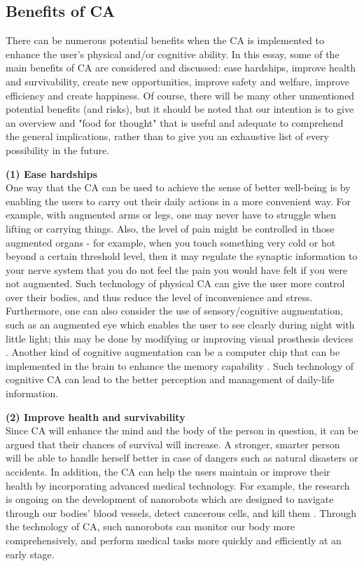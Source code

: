 \subsection{Benefits of CA}

There can be numerous potential benefits when the CA is implemented to enhance the user's physical and/or cognitive ability. In this essay, some of the main benefits of CA are considered and discussed: ease hardships, improve health and survivability, create new opportunities, improve safety and welfare, improve efficiency and create happiness. Of course, there will be many other unmentioned potential benefits (and risks), but it should be noted that our intention is to give an overview and "food for thought" that is useful and adequate to comprehend the general implications, rather than to give you an exhaustive list of every possibility in the future. 

{\bf (1) Ease hardships} \\ 
One way that the CA can be used to achieve the sense of better well-being is by enabling the users to carry out their daily actions in a more convenient way. For example, with augmented arms or legs, one may never have to struggle when lifting or carrying things. Also, the level of pain might be controlled in those augmented organs - for example, when you touch something very cold or hot beyond a certain threshold level, then it may regulate the synaptic information to your nerve system that you do not feel the pain you would have felt if you were not augmented. Such technology of physical CA can give the user more control over their bodies, and thus reduce the level of inconvenience and stress. Furthermore, one can also consider the use of sensory/cognitive augmentation, such as an augmented eye which enables the user to see clearly during night with little light; this may be done by modifying or improving visual prosthesis devices \cite{shepherd2013visual}. Another kind of cognitive augmentation can be a computer chip that can be implemented in the brain to enhance the memory capability \cite{berger2011cortical}. Such technology of cognitive CA can lead to the better perception and management of daily-life information.

{\bf (2) Improve health and survivability} \\
Since CA will enhance the mind and the body of the person in question, it can be argued that their chances of survival will increase. A stronger, smarter person will be able to handle herself better in case of dangers such as natural disasters or accidents. In addition, the CA can help the users maintain or improve their health by incorporating advanced medical technology. For example, the research is ongoing on the development of nanorobots which are designed to navigate through our bodies' blood vessels, detect cancerous cells, and kill them \cite{nanorobot}. Through the technology of CA, such nanorobots can monitor our body more comprehensively, and perform medical tasks more quickly and efficiently at an early stage. 

